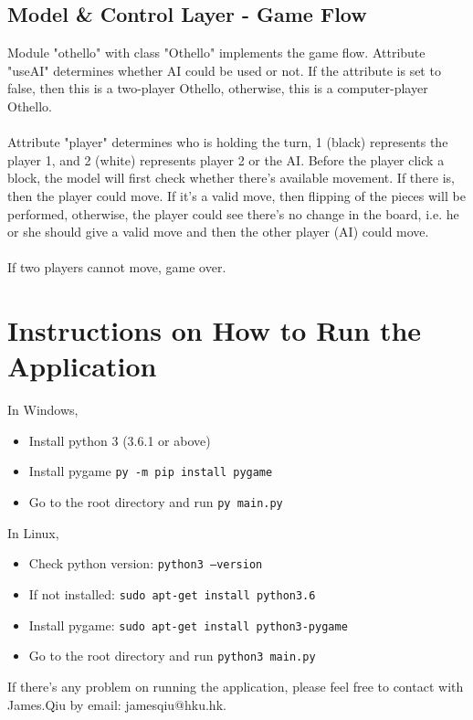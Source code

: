 \documentclass[letterpaper,12pt]{article}
\begin{document}
\subsection{Model \& Control Layer - Game Flow}
Module "othello" with class "Othello" implements the game flow. Attribute "useAI" determines whether AI could be used or not. If the attribute is set to false, then this is a two-player Othello, otherwise, this is a computer-player Othello.\\\\
\noindent
Attribute "player" determines who is holding the turn, 1 (black) represents the player 1, and 2 (white) represents player 2 or the AI. Before the player click a block, the model will first check whether there's available movement. If there is, then the player could move. If it's a valid move, then flipping of the pieces will be performed, otherwise, the player could see there's no change in the board, i.e. he or she should give a valid move and then the other player (AI) could move.\\\\
\noindent
If two players cannot move, game over.

\section{Instructions on How to Run the Application}

In Windows,

\begin{itemize}
\item Install python 3 (3.6.1 or above)
\item Install pygame \texttt{py -m pip install pygame}
\item Go to the root directory and run \texttt{py main.py}
\end{itemize}

\noindent
In Linux,

\begin{itemize}
\item Check python version: \texttt{python3 --version}
\item If not installed: \texttt{sudo apt-get install python3.6}
\item Install pygame: \texttt{sudo apt-get install python3-pygame}
\item Go to the root directory and run \texttt{python3 main.py}
\end{itemize}

\noindent
If there's any problem on running the application, please feel free to contact with James.Qiu by email: jamesqiu@hku.hk.
\end{document}
